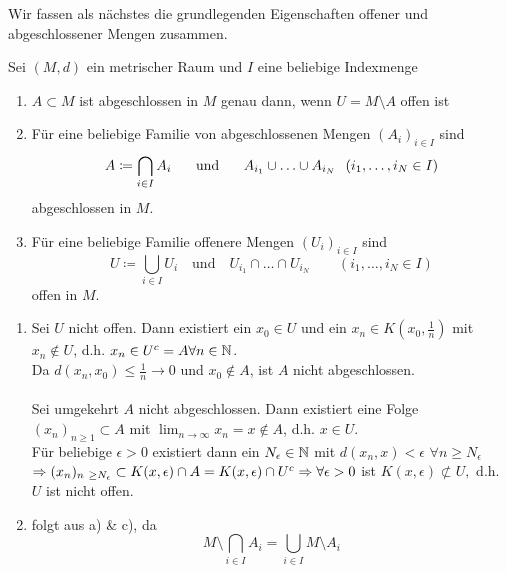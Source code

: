 Wir fassen als nächstes die grundlegenden Eigenschaften offener und abgeschlossener Mengen zusammen.


\begin{prop}
	Sei $(M, d)$ ein metrischer Raum und $I$ eine beliebige Indexmenge
	\begin{enumerate}[label=\alph*\upshape)]
		\item $A \subset M$ ist abgeschlossen in $M$ genau dann, wenn $U = M \setminus A$ offen ist
		\item Für eine beliebige Familie von abgeschlossenen Mengen $(A_{i})_{i \in I}$ sind 
			\[ A \coloneqq \bigcap_{i \in I} A_{i} \hspace{0.5cm} \text{ und } \hspace{0.5cm} A_{i_{1}} \cup \dotsc \cup A_{i_{N}} \hspace{0.25cm} (i_{1}, \dotsc, i_{N} \in I) \]
			abgeschlossen in $M$.
		\item Für eine beliebige Familie offenere Mengen $(U_{i})_{i \in I}$ sind
			\[ U \coloneqq \bigcup_{i \in I} U_{i} \quad \text{und} \quad U_{i_{1}} \cap \dotsc \cap U_{i_{N}} \qquad (i_{1}, \dotsc, i_{N} \in I) \] 
			offen in $M$.
	\end{enumerate}
	\begin{beweis}
		\begin{enumerate}[label=\alph*\upshape)]
			\item Sei $U$ nicht offen. Dann existiert ein $x_{0} \in U$ und  ein $x_{n} \in K(x_{0}, \frac{1}{n})$ mit $x_{n} \notin U$, d.h. $x_{n} \in U^{c} = A \forall n \in \mathbb{N}$. \\
				Da $d(x_{n}, x_{0}) \leq \frac{1}{n} \rightarrow 0$ und $x_{0} \notin A$, ist $A$ nicht abgeschlossen. \\ \\
				Sei umgekehrt $A$ nicht abgeschlossen. Dann existiert eine Folge $(x_{n})_{n \geq 1} \subset A$ mit $\lim_{n \rightarrow \infty} x_{n} = x \notin A$, d.h. $x \in U$. \\
				Für beliebige $\epsilon > 0$ existiert dann ein $N_{\epsilon} \in \mathbb{N}$ mit $d(x_{n}, x) < \epsilon$  $\forall n \geq N_{\epsilon}$ \\	
				$\Rightarrow (x_{n})_{n \geq N_{\epsilon}} \subset K(x, \epsilon) \cap A = K(x, \epsilon) \cap U^{c} \\
				\Rightarrow \forall \epsilon > 0 $ ist $ K(x, \epsilon) \not\subset U, $ d.h. $U$ ist nicht offen.
			\item folgt aus a) \& c), da
				\[ M \setminus \bigcap_{i \in I} A_{i} = \bigcup_{i \in I} M \setminus A_{i} \]

\end{enumerate}
\end{beweis}
\end{prop}
